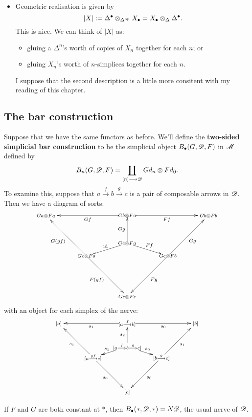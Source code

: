 \documentclass[11pt]{article}
\begin{document}
\begin{5. The unreasonably effective (co)bar construction}
\begin{itemise}
\begin{itemize}
\item Geometric realisation is given by
\[|X|:=\Delta^\bullet \otimes_{\Delta^{\textup{op}}}X_\bullet = X_\bullet\otimes_{\Delta} \Delta^\bullet.\]
This is nice. We can think of $|X|$ as:
\begin{itemize}\squishlist
\setlength{\parindent}{.25in}
\item gluing a $\Delta^n$'s worth of copies of $X_n$ together for each $n$; or
\item gluing $X_n$'s worth of $n$-simplices together for each $n$.
\end{itemize}
I suppose that the second description is a little more consitent with my reading of this chapter.
\end{itemize}
\end{itemise}
\subsection*{The bar construction}
Suppose that we have the same functors as before. We'll define the \textbf{two-sided simplicial bar construction} to be the simplicial object $B_\bullet (G,\mathscr{D},F)$ in $\mathscr{M}$ defined by
\[B_n(G,\mathscr{D},F)=\coprod_{[n]\longrightarrow\mathscr{D}}Gd_n\otimes Fd_0.\]
To examine this, suppose that $a\overset{f}{\to}b\overset{g}{\to}c$ is a pair of composable arrows in $\mathscr{D}$. Then we have a diagram of sorts:
\[{\def\objectstyle{\scriptstyle}
\xymatrix@!0@=3cm@!C{
Ga\otimes Fa
\ar@{}[rr]|{Gb\otimes Fa}="2"
\ar@{}[rd]|{Gc\otimes Fa}="8"
&&%
Gb\otimes Fb
\ar@{}[ld]|{Gc\otimes Fb}="6"
\\&%
\ar@{}"2"|(.657){Gc\otimes Fa}="3"
Gc\otimes Fc
\ar"2";[lu]^-{Gf}
\ar"2";[ru]_-{Ff}
\ar"6";[ru]_-{Gg}
\ar"6";[]^-{Fg}
\ar"3";"2"^-{Gg}
\ar"3";"6"^-{Ff}
\ar"3";"8"_-{\id}
\ar"8";[]_-{F(gf)}
\ar"8";[lu]^-{G(gf)}
%
}}\]
with an object for each simplex of the nerve:
\[{\def\objectstyle{\scriptstyle}
\xymatrix@!0@=3cm@!C{
[a]
\ar@{}[rr]|{[a\overset{f}{\to}b]}="2"
\ar@{}[rd]|{[a\overset{gf}{\to}c]}="8"
&&%
[b]
\ar@{}[ld]|{[b\overset{g}{\to}c]}="6"
\\&%
\ar@{}"2"|(.657){[a\overset{f}{\to}b\overset{g}{\to}c]}="3"
[c]
\ar"2";[lu]^-{s_1}
\ar"2";[ru]_-{s_0}
\ar"6";[ru]_-{s_1}
\ar"6";[]^-{s_0}
\ar"3";"2"^-{s_2}
\ar"3";"6"^-{s_0}
\ar"3";"8"_-{s_1}
\ar"8";[]_-{s_0}
\ar"8";[lu]^-{s_1}
%
}}\]
\begin{itemise}
\setlength{\parindent}{.25in}
\item If $F$ and $G$ are both constant at $*$, then $B_{\bullet }(*,\mathscr{D},*)=N\mathscr{D}$, the usual nerve of $\mathscr{D}$.

\end{itemise}
\end{5. The unreasonably effective (co)bar construction}
\end{document}
